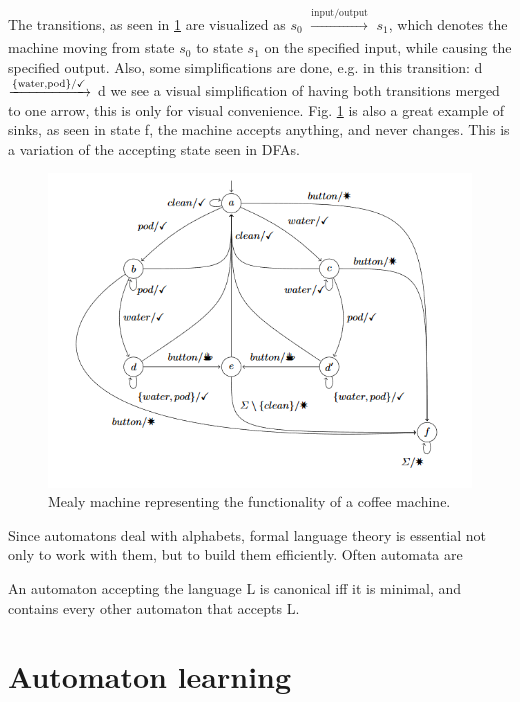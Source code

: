 The transitions, as seen in \ref{fig:coffeemealy} are visualized as $s_0$ $\xrightarrow[]{\text{input/output}}$ $s_1$, which denotes the machine moving from state $s_0$ to state $s_1$ on the specified input, while causing the specified output. Also, some simplifications are done, e.g. in this transition: d $\xrightarrow[]{\text{\{water,pod\}/\checkmark}}$ d we see a visual simplification of having both transitions merged to one arrow, this is only for visual convenience. Fig. \ref{fig:coffeemealy} is also a great example of sinks, as seen in state f, the machine accepts anything, and never changes. This is a variation of the accepting state seen in DFAs.

\begin{figure}[H]
	\centering
	\includegraphics[width=0.7\linewidth]{content/coffeemealy}
	\caption{Mealy machine representing the functionality of a coffee machine.\cite{Steffen2011}}
	\label{fig:coffeemealy}
\end{figure}

Since automatons deal with alphabets, formal language theory is essential not only to work with them, but to build them efficiently. Often automata are 


\begin{definition}
	An automaton accepting the language L is canonical iff it is minimal, and contains every other automaton that accepts L.
\end{definition}

\section{Automaton learning}



